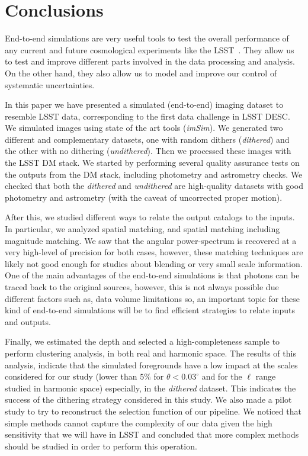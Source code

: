 \documentclass[\docopts]{\docclass}
\begin{document}
\section{Conclusions}
\label{sec:conclusions}

End-to-end simulations are very useful tools to test the overall performance of any current and future cosmological experiments like the LSST~\citep{2008arXiv0805.2366I}. They allow us to test and improve different parts involved in the data processing and analysis. On the other hand, they also allow us to model and improve our control of systematic uncertainties.

In this paper we have presented a simulated (end-to-end) imaging dataset to resemble LSST data, corresponding to the first data challenge in LSST DESC. We simulated images using state of the art tools (\textit{imSim}). We generated two different and complementary datasets, one with random dithers (\textit{dithered}) and the other with no dithering (\textit{undithered}). Then we processed these images with the LSST DM stack. We started by performing several quality assurance tests on the outputs from the DM stack, including photometry and astrometry checks. We checked that both the \textit{dithered} and \textit{undithered} are high-quality datasets with good photometry and astrometry (with the caveat of uncorrected proper motion). 

After this, we studied different ways to relate the output catalogs to the inputs. In particular, we analyzed spatial matching, and spatial matching including magnitude matching. We saw that the angular power-spectrum is recovered at a very high-level of precision for both cases, however, these matching techniques are likely not good enough for studies about blending or very small scale information. One of the main advantages of the end-to-end simulations is that photons can be traced back to the original sources, however, this is not always possible due different factors such as, data volume limitations so, an important topic for these kind of end-to-end simulations will be to find efficient strategies to relate inputs and outputs.
 
Finally, we estimated the depth and selected a high-completeness sample to perform clustering analysis, in both real and harmonic space. The results of this analysis, indicate that the simulated foregrounds have a low impact at the scales considered for our study (lower than $5\%$ for $\theta < 0.03^{\circ}$ and for the $\ell$ range studied in harmonic space) especially, in the \textit{dithered} dataset. This indicates the success of the dithering strategy considered in this study. We also made a pilot study to try to reconstruct the selection function of our pipeline. We noticed that simple methods cannot capture the complexity of our data given the high sensitivity that we will have in LSST and concluded that more complex methods should be studied in order to perform this operation.
\end{document}
